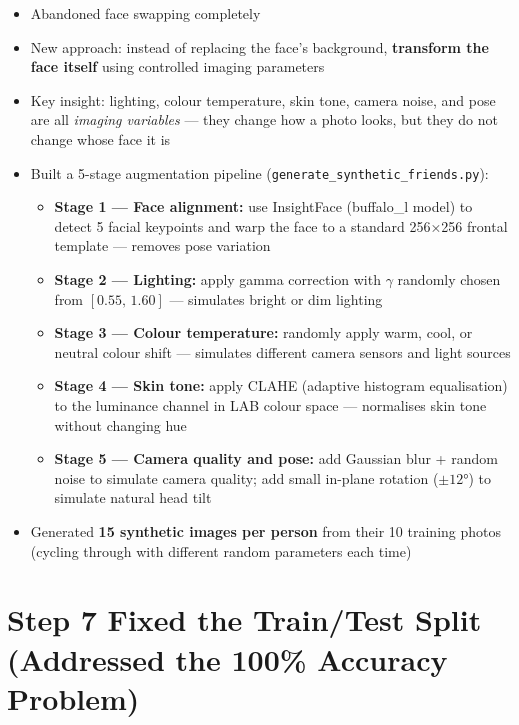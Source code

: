 \documentclass[11pt,a4paper]{article}
\begin{document}
\begin{itemize}
    \item Abandoned face swapping completely
    \item New approach: instead of replacing the face's background, \textbf{transform the face itself} using controlled imaging parameters
    \item Key insight: lighting, colour temperature, skin tone, camera noise, and pose are all \textit{imaging variables} — they change how a photo looks, but they do not change whose face it is
    \item Built a 5-stage augmentation pipeline (\texttt{generate\_synthetic\_friends.py}):
    \begin{itemize}
        \item \textbf{Stage 1 — Face alignment:} use InsightFace (buffalo\_l model) to detect 5 facial keypoints and warp the face to a standard 256×256 frontal template — removes pose variation
        \item \textbf{Stage 2 — Lighting:} apply gamma correction with $\gamma$ randomly chosen from $[0.55,\, 1.60]$ — simulates bright or dim lighting
        \item \textbf{Stage 3 — Colour temperature:} randomly apply warm, cool, or neutral colour shift — simulates different camera sensors and light sources
        \item \textbf{Stage 4 — Skin tone:} apply CLAHE (adaptive histogram equalisation) to the luminance channel in LAB colour space — normalises skin tone without changing hue
        \item \textbf{Stage 5 — Camera quality and pose:} add Gaussian blur + random noise to simulate camera quality; add small in-plane rotation ($\pm 12°$) to simulate natural head tilt
    \end{itemize}
    \item Generated \textbf{15 synthetic images per person} from their 10 training photos (cycling through with different random parameters each time)
\end{itemize}

\section*{Step 7 \quad Fixed the Train/Test Split (Addressed the 100\% Accuracy Problem)}
\end{document}
